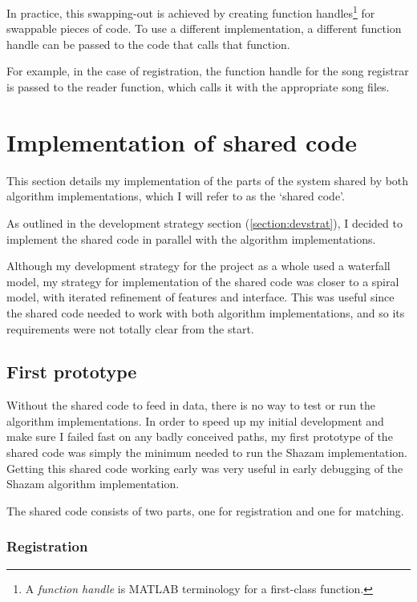 \documentclass[12pt,a4paper,twoside,openright]{report}
\begin{document}
In practice, this swapping-out is achieved by creating function handles\footnote{A \textit{function handle} is MATLAB terminology for a first-class function.} for swappable pieces of code. To use a different implementation, a different function handle can be passed to the code that calls that function.

For example, in the case of registration, the function handle for the song registrar is passed to the reader function, which calls it with the appropriate song files.


\section{Implementation of shared code}
\label{section:sharedimpl}

This section details my implementation of the parts of the system shared by both algorithm implementations, which I will refer to as the `shared code'.

As outlined in the development strategy section (\ref{section:devstrat}), I decided to implement the shared code in parallel with the algorithm implementations.

Although my development strategy for the project as a whole used a waterfall model, my strategy for implementation of the shared code was closer to a spiral model, with iterated refinement of features and interface. This was useful since the shared code needed to work with both algorithm implementations, and so its requirements were not totally clear from the start. 


\subsection{First prototype}

Without the shared code to feed in data, there is no way to test or run the algorithm implementations. In order to speed up my initial development and make sure I failed fast on any badly conceived paths, my first prototype of the shared code was simply the minimum needed to run the Shazam implementation. Getting this shared code working early was very useful in early debugging of the Shazam algorithm implementation.

The shared code consists of two parts, one for registration and one for matching. 

\subsubsection{Registration}
\end{document}
